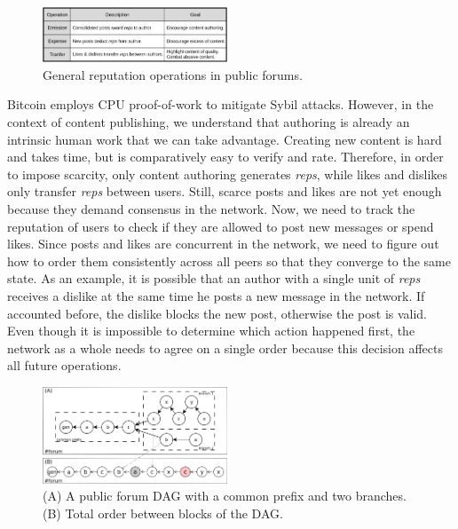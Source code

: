 \documentclass[10pt,journal,compsoc]{IEEEtran}
\newcommand{\reps}     {\emph{reps}\xspace}
\begin{document}
\begin{figure}
\centering
\includegraphics[width=0.49\textwidth]{general.png}
\caption{General reputation operations in public forums.}
\label{fig.general}
\end{figure}

Bitcoin employs CPU proof-of-work to mitigate Sybil attacks.
However, in the context of content publishing, we understand that authoring is
already an intrinsic human work that we can take advantage.
Creating new content is hard and takes time, but is comparatively easy to
verify and rate.
Therefore, in order to impose scarcity, only content authoring generates \reps,
while likes and dislikes only transfer \reps between users.
%
Still, scarce posts and likes are not yet enough because they demand consensus
in the network.
Now, we need to track the reputation of users to check if they are allowed to
post new messages or spend likes.
Since posts and likes are concurrent in the network, we need to figure out how
to order them consistently across all peers so that they converge to the same
state.
As an example, it is possible that an author with a single unit of \reps
receives a dislike at the same time he posts a new message in the network.
If accounted before, the dislike blocks the new post, otherwise the post is
valid.
Even though it is impossible to determine which action happened first, the
network as a whole needs to agree on a single order because this decision
affects all future operations.

\begin{figure}
\centering
\includegraphics[width=0.49\textwidth]{reps2.png}
\caption{
    (A) A public forum DAG with a common prefix and two branches.
    (B) Total order between blocks of the DAG.
}
\label{fig.reps}
\end{figure}
\end{document}
